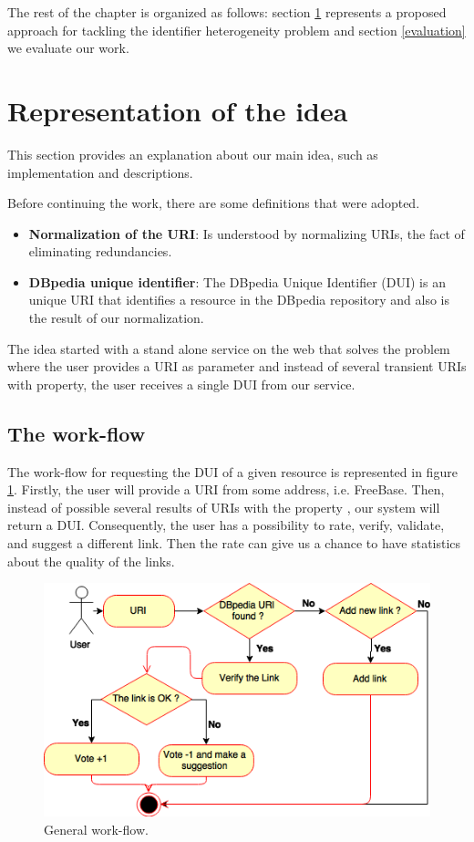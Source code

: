 The rest of the chapter is organized as follows: 
section \ref{representationidea} represents a proposed approach for tackling the identifier heterogeneity problem and section \ref{evaluation} we evaluate our work.


\section{Representation of the idea}\label{representationidea}

This section provides an explanation about our main idea, such as implementation and descriptions.

Before continuing the work, there are some definitions that were adopted.
\begin{itemize}
\item  \textbf{Normalization of the URI}: Is understood by normalizing URIs, the fact of eliminating redundancies.

\item \textbf{DBpedia unique identifier}: The DBpedia Unique Identifier (DUI) is an unique URI that identifies a resource in the DBpedia repository and also is the result of our normalization.
\end{itemize}

The idea started with a stand alone service on the web that solves the problem where the user provides a URI as parameter and instead of several transient URIs with  property, the user receives a single DUI from our service.

\subsection{The work-flow}
The work-flow for requesting the DUI of a given resource is represented in  figure \ref{fig:generalworkflow}.
Firstly, the user will provide a URI from some address, i.e. FreeBase. Then, instead of possible several results of URIs with the property , our system will return a DUI. Consequently, the user has a possibility to rate, verify, validate, and suggest a different link. Then the rate can give us a chance to have statistics about the quality of the links.

\begin{figure}[hbt] 
  	\centering
	\includegraphics[width=\columnwidth]{img/generalFlow.png}
 	\caption{General work-flow.}
  	\label{fig:generalworkflow}
\end{figure}

